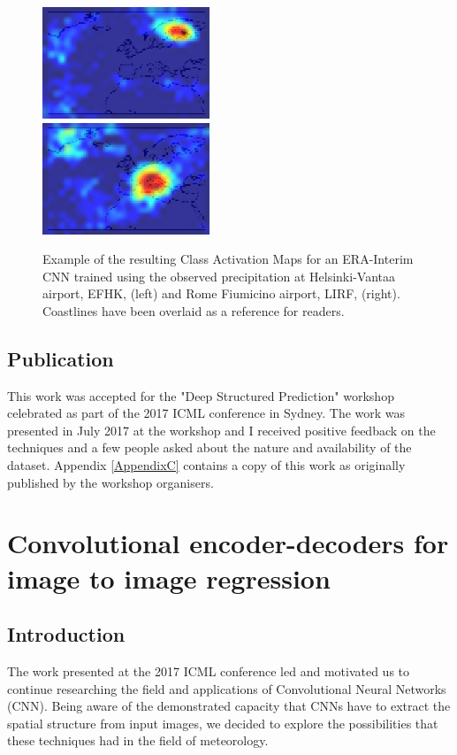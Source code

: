 \begin{figure}[h]
 \centerline{\includegraphics[width=5cm]{paper3_2.png}\\\includegraphics[width=5cm]{paper3_1.png}}\caption{Example of the resulting Class Activation Maps for an ERA-Interim CNN trained using the observed precipitation at Helsinki-Vantaa airport, EFHK, (left) and Rome Fiumicino airport, LIRF, (right). Coastlines have been overlaid as a reference for readers.}\label{paper3}
\end{figure}


\subsection{Publication}

This work was accepted for the "Deep Structured Prediction" workshop celebrated as part of the 2017 ICML conference in Sydney. The work was presented in July 2017 at the workshop and I received positive feedback on the techniques and a few people asked about the nature and availability of the dataset. Appendix \ref{AppendixC} contains a copy of this work as originally published by the workshop organisers.


\section{Convolutional encoder-decoders for image to image regression}

\subsection{Introduction}
The work presented at the 2017 ICML conference led and motivated us to continue researching the field and applications of Convolutional Neural Networks (CNN). Being aware of the demonstrated capacity that CNNs have to extract the spatial structure from input images, we decided to explore the possibilities that these techniques had in the field of meteorology.

